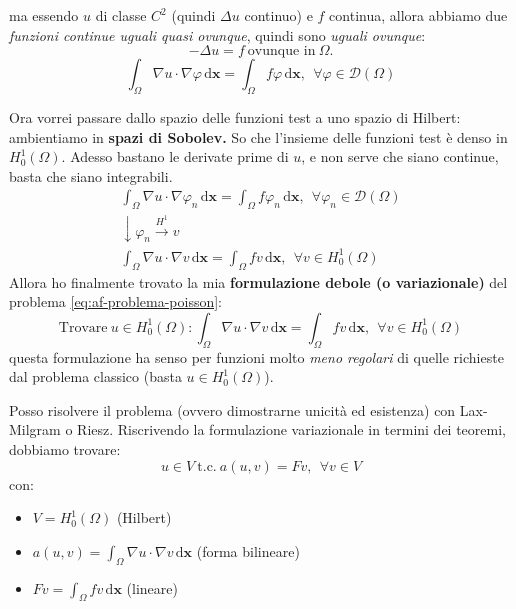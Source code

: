 \documentclass[10pt,a4paper,twoside,openright]{book}
\newcommand{\x}{\mathbf{x}}
\newcommand{\de}{\,\mathrm d}
\newcommand{\dxx}{\de \x}
\begin{document}
\begin{itemize}
{\begin{equation*}
              \end{equation*}
              ma essendo $u$ di classe $\displaystyle C^{2}$ (quindi $\displaystyle \Delta u$ continuo) e $f$ continua, allora abbiamo due \textit{funzioni continue uguali quasi ovunque}, quindi sono \textit{uguali ovunque}:
              \begin{equation*}
                  -\Delta u=f\ \text{ovunque in} \ \Omega .
              \end{equation*}}
          \begin{equation}
              \boxed{\int _{\Omega } \nabla u\cdotp \nabla \varphi \dxx =\int _{\Omega } f\varphi \dxx ,\ \ \forall \varphi \in \mathcal{D}(\Omega)}
          \end{equation}
\end{itemize}

Ora vorrei passare dallo spazio delle funzioni test a uno spazio di Hilbert: ambientiamo in \textbf{spazi di Sobolev. }So che l'insieme delle funzioni test è denso in $\displaystyle H_{0}^{1}(\Omega)$. Adesso bastano le derivate prime di $u$, e non serve che siano continue, basta che siano integrabili.
\begin{gather*}
    \int _{\Omega } \nabla u\cdotp \nabla \varphi _{n} \dxx =\int _{\Omega } f\varphi _{n} \dxx ,\ \ \forall \varphi _{n} \in \mathcal{D}(\Omega)\\
    \downarrow \varphi _{n}\xrightarrow{H^{1}} v\\
    \int _{\Omega } \nabla u\cdotp \nabla v\dxx =\int _{\Omega } fv\dxx ,\ \ \forall v\in H_{0}^{1}(\Omega)
\end{gather*}
Allora ho finalmente trovato la mia \textbf{formulazione debole (o variazionale)} del problema \eqref{eq:af-problema-poisson}:
\begin{equation}
    \boxed{\text{Trovare} \ u\in H_{0}^{1}(\Omega) :\int _{\Omega } \nabla u\cdotp \nabla v\dxx =\int _{\Omega } fv\dxx ,\ \ \forall v\in H_{0}^{1}(\Omega)}
\end{equation}
questa formulazione ha senso per funzioni molto \textit{meno regolari} di quelle richieste dal problema classico (basta $\displaystyle u\in H_{0}^{1}(\Omega)$).

Posso risolvere il problema (ovvero dimostrarne unicità ed esistenza) con Lax-Milgram o Riesz. Riscrivendo la formulazione variazionale in termini dei teoremi, dobbiamo trovare:
\begin{equation*}
    u\in V\ \text{t.c.} \ a(u,v) =Fv,\ \ \forall v\in V
\end{equation*}
con:
\begin{itemize}
    \item $\displaystyle V=H_{0}^{1}(\Omega)$ (Hilbert)
    \item $\displaystyle a(u,v) =\int _{\Omega } \nabla u\cdotp \nabla v\dxx$ (forma bilineare)
    \item $\displaystyle Fv=\int _{\Omega } fv\dxx$ (lineare)
\end{itemize}
\end{document}
